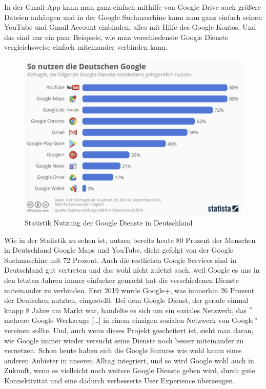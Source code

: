 In der Gmail-App kann man ganz einfach mithilfe von Google Drive auch größere Dateien anhängen und in der Google Suchmaschine kann man ganz einfach seinen YouTube und Gmail Account einbinden, alles mit Hilfe des Google Kontos.
Und das sind nur ein paar Beispiele, wie man verschiedenste Google Dienste vergleichsweise einfach miteinander verbinden kann.
\begin{figure}[ht]
    \centering
    \includegraphics[width=120mm]{images/statistic_googleServices}
    \caption{Statistik Nutzung der Google Dienste in Deutschland}
    \label{fig:statisticGoogleServices}
\end{figure}  %
Wie in der Statistik zu sehen ist, nutzen bereits heute 80 Prozent der Menschen in Deutschland Google Maps und YouTube, dicht gefolgt von der Google Suchmaschine mit 72 Prozent.
Auch die restlichen Google Services sind in Deutschland gut vertreten und das wohl nicht zuletzt auch,
weil Google es uns in den letzten Jahren immer einfacher gemacht hat die verschiedenen Dienste miteinander zu verbinden.
Erst 2019 wurde Google+, was immerhin 26 Prozent der Deutschen nutzten, eingestellt.
Bei dem Google Dienst, der gerade einmal knapp 8 Jahre am Markt war, handelte es sich um ein soziales Netzwerk,
das \("\)mehrere Google-Werkzeuge [\ldots] in einem einzigen sozialen Netzwerk von Google\("\)\cite{JEC21} vereinen sollte.\cite{JEC21}
Und, auch wenn dieses Projekt gescheitert ist, sieht man daran, wie Google immer wieder versucht seine Dienste noch besser miteinander zu vernetzen.
Schon heute haben sich die Google features wie wohl kaum eines anderen Anbieter in unseren Alltag integriert,
und so wird Google wohl auch in Zukunft, wenn es vielleicht noch weitere Google Dienste geben wird, durch gute Konnektivität und eine dadurch verbesserte User Experience überzeugen.\\

